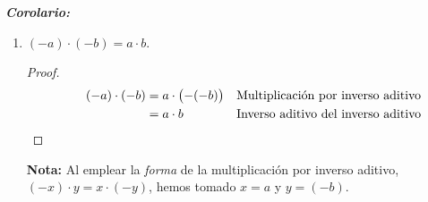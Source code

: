 \documentclass[11pt]{article}
\newcommand{\bfit}[1]{\textbf{\textit{#1}}}
\begin{document}
\begin{enumerate}[label=\alph*)]
 \bfit{Corolario:}
 \begin{enumerate}[label=\roman*)]
  \item $(-a)\cdot(-b)=a\cdot b$.%
  \begin{proof} 
   \begin{align*}
    \qquad (-a)\cdot (-b) &= a \cdot \bigl(-(-b)\bigr) && \text{Multiplicación por inverso aditivo}\\
    \qquad &= a \cdot b && \text{Inverso aditivo del inverso aditivo} \qedhere
   \end{align*} 
  \end{proof}
  \textbf{Nota:} Al emplear la \textit{forma} de la multiplicación por inverso aditivo, $(-x)\cdot y = x \cdot (-y)$, hemos tomado $x=a$ y $y=(-b)$.
%
%

\end{enumerate}
\end{enumerate}
\end{document}
